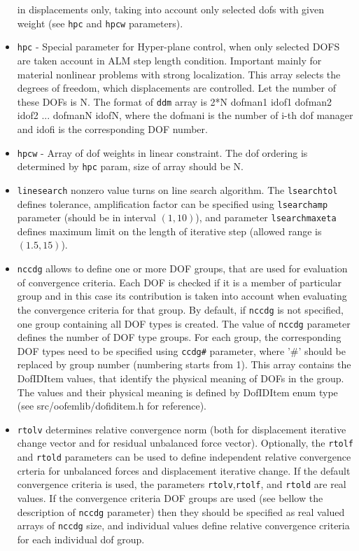 \documentclass[a4paper]{article}
\newcommand{\param}[1]{\texttt{#1}} %
\begin{document}
\begin{itemize}
in displacements only, taking into account only selected dofs with
given weight (see \param{hpc} and \param{hpcw} parameters).
\item \param{hpc} - Special parameter for Hyper-plane control, when only
selected DOFS are taken account in ALM step length
condition. Important mainly for material nonlinear problems with
strong localization. This array selects the degrees of freedom,
which displacements are controlled. Let the number of these DOFs is N.
The format of \param{ddm} array is 2*N dofman1 idof1
dofman2 idof2 ... dofmanN idofN, where the dofmani is the number of i-th dof manager  and idofi is the
corresponding DOF number.
\item \param{hpcw} - Array of dof weights in linear constraint. The
dof ordering is determined by \param{hpc} param, size of array should
be N.
\item \param{linesearch} nonzero value turns on line search
  algorithm. The \param{lsearchtol} defines tolerance, amplification
  factor can be specified using \param{lsearchamp} parameter (should
  be in interval $(1,10)$), and parameter \param{lsearchmaxeta}
  defines maximum limit on the length of iterative step (allowed range
  is $(1.5,15)$).
\item \param{nccdg} allows to define one or more DOF groups, that are used for evaluation of convergence criteria. Each DOF is checked if it is a member of particular group and in this case its contribution is taken into account when evaluating the convergence criteria for that group. By default, if \param{nccdg} is not specified, one group containing all DOF types is created. The value of \param{nccdg} parameter defines the number of DOF type groups. For each group, the corresponding DOF types need to be specified using \param{ccdg\#} parameter, where '\#' should be replaced by group number (numbering starts from 1). This array contains the DofIDItem values, that identify the physical meaning of DOFs in the group. The values and their physical meaning is defined by DofIDItem enum type (see src/oofemlib/dofiditem.h for reference).
\item \param{rtolv} determines relative convergence norm (both for displacement
iterative change vector and for residual unbalanced force vector). Optionally, the \param{rtolf} and \param{rtold} parameters can be used to define
independent relative convergence crteria for unbalanced forces and displacement
iterative change. If the default convergence criteria is used,
the parameters \param{rtolv},\param{rtolf}, and \param{rtold} are real values. If the convergence criteria DOF groups are used (see bellow the description of \param{nccdg} parameter) then they should be specified as real valued arrays of \param{nccdg} size, and individual values define relative convergence criteria for each individual dof group.
\end{itemize}
\end{document}
